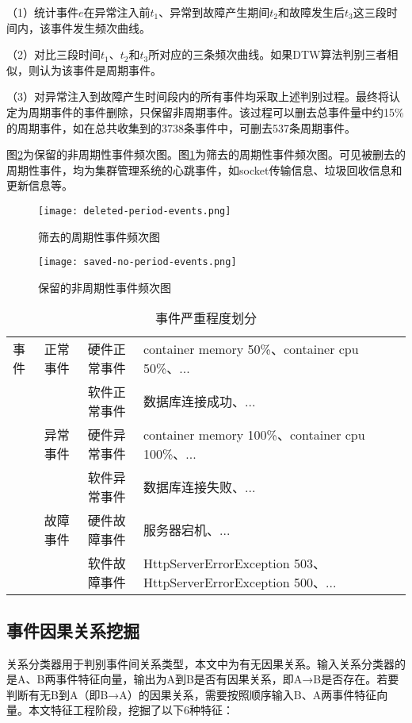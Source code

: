 （1）统计事件$e$在异常注入前$t_1$、异常到故障产生期间$t_2$和故障发生后$t_{3}$这三段时间内，该事件发生频次曲线。

（2）对比三段时间$t_1$、$t_2$和$t_{3}$所对应的三条频次曲线。如果DTW算法判别三者相似，则认为该事件是周期事件。

（3）对异常注入到故障产生时间段内的所有事件均采取上述判别过程。最终将认定为周期事件的事件删除，只保留非周期事件。该过程可以删去总事件量中约15\%的周期事件，如在总共收集到的3738条事件中，可删去537条周期事件。

图\ref{saved-no-period-events}为保留的非周期性事件频次图。图\ref{deleted-period-events}为筛去的周期性事件频次图。可见被删去的周期性事件，均为集群管理系统的心跳事件，如socket传输信息、垃圾回收信息和更新信息等。
\begin{figure}[htbp]
    \centering
    \texttt{[image: deleted-period-events.png]}
    \caption{筛去的周期性事件频次图\label{deleted-period-events}}
\end{figure}
\begin{figure}[htbp]
    \centering
    \texttt{[image: saved-no-period-events.png]}
    \caption{保留的非周期性事件频次图\label{saved-no-period-events}}
\end{figure}

\begin{table}[]
    \caption{事件严重程度划分}
    \label{event-type}
    \begin{tabular}{llll}
    \hline
    事件 & 正常事件 & 硬件正常事件 & container memory 50\%、container cpu 50\%、...                  \\
       &      & 软件正常事件 & 数据库连接成功、...                                                   \\ \cline{2-4} 
       & 异常事件 & 硬件异常事件 & container memory 100\%、container cpu 100\%、...                \\
       &      & 软件异常事件 & 数据库连接失败、...                                                   \\ \cline{2-4} 
       & 故障事件 & 硬件故障事件 & 服务器宕机、...                                                     \\
       &      & 软件故障事件 & HttpServerErrorException 503、HttpServerErrorException 500、... \\ \hline
    \end{tabular}
\end{table}

\subsection{事件因果关系挖掘}
关系分类器用于判别事件间关系类型，本文中为有无因果关系。输入关系分类器的是A、B两事件特征向量，输出为A到B是否有因果关系，即A→B是否存在。若要判断有无B到A（即B→A）的因果关系，需要按照顺序输入B、A两事件特征向量。本文特征工程阶段，挖掘了以下6种特征：


